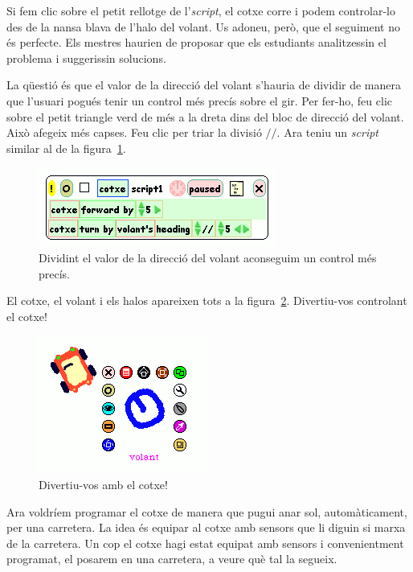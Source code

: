 Si fem clic sobre el petit rellotge de l'\emph{script}, el cotxe corre i podem controlar-lo des de la nansa blava de l'halo del volant. Us adoneu, però, que el seguiment no és perfecte. Els mestres haurien de proposar que els estudiants analitzessin el problema i suggerissin solucions.

La qüestió és que el valor de la direcció del volant s'hauria de dividir de manera que l'usuari pogués tenir un control més precís sobre el gir. Per fer-ho, feu clic sobre el petit triangle verd de més a la dreta dins del bloc de direcció del volant. Això afegeix més capses. Feu clic per triar la divisió $//$. Ara teniu un \emph{script} similar al de la figura~\ref{fig2437}.  
\begin{figure}[h!]
\begin{center}
\includegraphics[scale=0.6]{Imatges/figura24-37}
\end{center}
\caption{Dividint el valor de la direcció del volant aconseguim un control més precís.}
\label{fig2437}
\end{figure}

El cotxe, el volant i els halos apareixen tots a la figura~\ref{fig2438}. Divertiu-vos controlant el cotxe!
\begin{figure}[h!]
\begin{center}
\includegraphics[scale=0.8]{Imatges/figura24-38}
\end{center}
\caption{Divertiu-vos amb el cotxe!}
\label{fig2438}
\end{figure}

Ara voldríem programar el cotxe de manera que pugui anar sol, automàticament, per una carretera. La idea és 
equipar al cotxe amb sensors que li diguin si marxa de la carretera. Un cop el cotxe hagi estat equipat amb sensors i convenientment programat, el posarem en una carretera, a veure què tal la segueix.  

